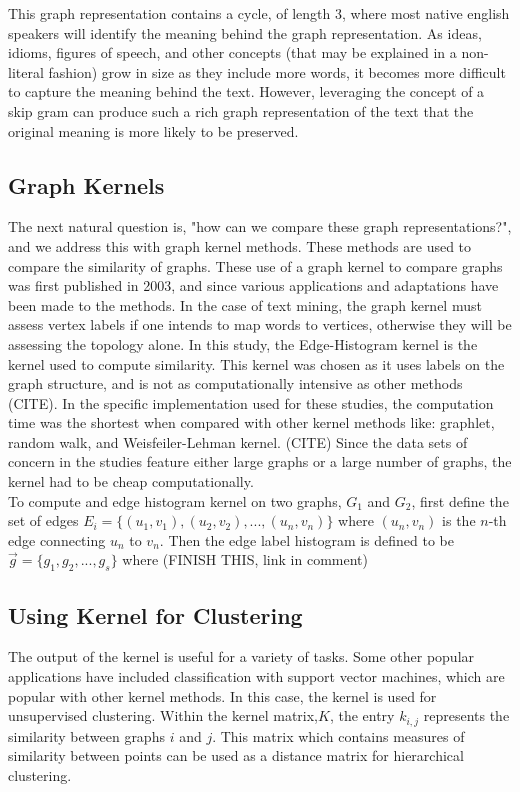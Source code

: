 This graph representation contains a cycle, of length 3, where most native english speakers will identify the meaning behind the graph representation. As ideas, idioms, figures of speech, and other concepts (that may be explained in a non-literal fashion) grow in size as they include more words, it becomes more difficult to capture the meaning behind the text. However, leveraging the concept of a skip gram can produce such a rich graph representation of the text that the original meaning is more likely to be preserved. \\

\subsection{ Graph Kernels}
The next natural question is, "how can we compare these graph representations?", and we address this with graph kernel methods. These methods are used to compare the similarity of graphs. These use of a graph kernel to compare graphs was first published in 2003, and since various applications and adaptations have been made to the methods. In the case of text mining, the graph kernel must assess vertex labels \textemdash if one intends to map words to vertices, otherwise they will be assessing the topology alone. In this study, the Edge-Histogram kernel is the kernel used to compute similarity. This kernel was chosen as it uses labels on the graph structure, and is not as computationally intensive as other methods (CITE). In the specific implementation used for these studies, the computation time was the shortest when compared with other kernel methods like: graphlet, random walk, and Weisfeiler-Lehman kernel. (CITE) Since the data sets of concern in the studies feature either large graphs or a large number of graphs, the kernel had to be cheap computationally.\\

To compute and edge histogram kernel on two graphs, $G_1$ and $G_2$, first define the set of edges $E_i =\{ (u_1,v_1), (u_2,v_2), ... , (u_n,v_n) \}$ where $(u_n,v_n)$ is the $n$-th edge connecting $u_n$ to $v_n$. Then the edge label histogram is defined to be $\vec{g} = \{ g_1, g_2, ... , g_s\}$ where 
(FINISH THIS, link in comment)

\subsection{Using Kernel for Clustering}

The output of the kernel is useful for a variety of tasks. Some other popular applications have included classification with support vector machines, which are popular with other kernel methods. In this case, the kernel is used for unsupervised clustering. Within the kernel matrix,$K$, the entry $k_{i,j}$ represents the similarity between graphs $i$ and $j$. This matrix which contains measures of similarity between points can be used as a distance matrix for hierarchical clustering. 





